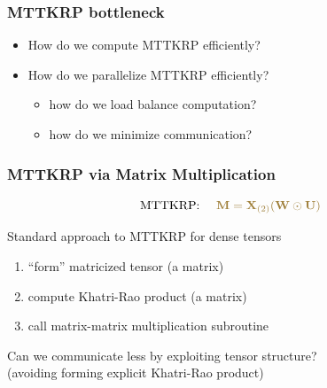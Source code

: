 \documentclass[xcolor=dvipsnames]{beamer}
\begin{document}
\begin{frame}
\frametitle{MTTKRP bottleneck}

\begin{itemize}
	\item How do we compute MTTKRP efficiently?
	\vfill
	\item How do we parallelize MTTKRP efficiently?
	\begin{itemize}
		\item how do we load balance computation?
		\item how do we minimize communication?
	\end{itemize}
\end{itemize}

\end{frame}

\begin{frame}
\frametitle{MTTKRP via Matrix Multiplication}

$$\text{MTTKRP:  } \quad \textcolor{wfugold}{\M{M} = \Mz{X}{2}(\M{W} \Khat \M{U})}$$

\vfill

Standard approach to MTTKRP for dense tensors
\begin{enumerate}
	\item ``form'' matricized tensor (a matrix)
	\item compute Khatri-Rao product (a matrix)
	\item call matrix-matrix multiplication subroutine
\end{enumerate}

\vfill

\begin{center}
Can we communicate less by exploiting tensor structure? \\ (avoiding forming explicit Khatri-Rao product)
\end{center}

\end{frame}
\end{document}
